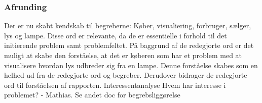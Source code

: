 \subsubsection{Afrunding}
Der er nu skabt kendskab til begreberne: Køber, visualiering, forbruger, sælger,  lys og lampe. Disse ord er relevante, da de er essentielle i forhold til det initierende problem samt problemfeltet. På baggrund af de redegjorte ord er det muligt at skabe den forståelse, at det er køberen som har et problem med at visualisere hvordan lys udbreder sig fra en lampe. Denne forståelse skabes som en helhed ud fra de redegjorte ord og begreber. 
Derudover bidrager de redegjorte ord til forståelsen af rapporten.
Interessentanalyse
Hvem har interesse i problemet? - Mathias. Se andet doc for begrebsliggørelse
 



